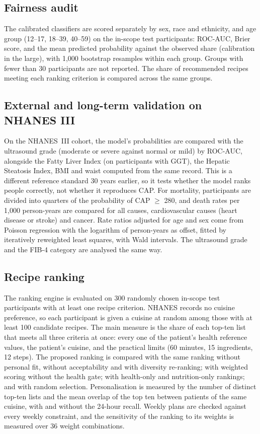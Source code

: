 \subsection{Fairness audit}

The calibrated classifiers are scored separately by sex, race and ethnicity,
and age group (12--17, 18--39, 40--59) on the in-scope test participants:
ROC-AUC, Brier score, and the mean predicted probability against the observed
share (calibration in the large), with 1{,}000 bootstrap resamples within each
group. Groups with fewer than 30 participants are not reported. The share of
recommended recipes meeting each ranking criterion is compared across the same
groups.

\subsection{External and long-term validation on NHANES III}

On the NHANES~III cohort, the model's probabilities are compared with the
ultrasound grade (moderate or severe against normal or mild) by ROC-AUC,
alongside the Fatty Liver Index (on participants with GGT), the Hepatic
Steatosis Index, BMI and waist computed from the same record. This is a
different reference standard 30 years earlier, so it tests whether the model
ranks people correctly, not whether it reproduces CAP. For mortality,
participants are divided into quarters of the probability of CAP $\geq$ 280,
and death rates per 1{,}000 person-years are compared for all causes,
cardiovascular causes (heart disease or stroke) and cancer. Rate ratios
adjusted for age and sex come from Poisson regression with the logarithm of
person-years as offset, fitted by iteratively reweighted least squares, with
Wald intervals. The ultrasound grade and the FIB-4 category are analysed the
same way.

\subsection{Recipe ranking}

The ranking engine is evaluated on 300 randomly chosen in-scope test
participants with at least one recipe criterion. NHANES records no cuisine
preference, so each participant is given a cuisine at random among those with
at least 100 candidate recipes. The main measure is the share of each top-ten
list that meets all three criteria at once: every one of the patient's health
reference values, the patient's cuisine, and the practical limits (60 minutes,
15 ingredients, 12 steps). The proposed ranking is compared with the same
ranking without personal fit, without acceptability and with diversity
re-ranking; with weighted scoring without the health gate; with health-only
and nutrition-only rankings; and with random selection. Personalisation is
measured by the number of distinct top-ten lists and the mean overlap of the
top ten between patients of the same cuisine, with and without the 24-hour
recall. Weekly plans are checked against every weekly constraint, and the
sensitivity of the ranking to its weights is measured over 36 weight
combinations.

